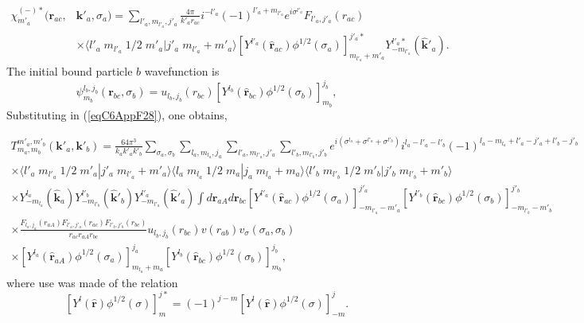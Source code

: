 \begin{subappendices}
\begin{equation}
\begin{split}
\chi^{(-)*}_{m'_a}(\mathbf{r}_{ac},&\mathbf{k}'_{a},\sigma_a)= \sum_{l'_a,m_{l'_a},j'_a}\frac{4\pi}{k'_a r_{ac}} i^{-l'_a}(-1)^{l'_a+m_{l'_a}}
e^{i\sigma^{l'_a}} F_{l'_a,j'_a}(r_{ac})\\
 &\times\langle l'_a\;m_{l'_a}\;1/2\;m'_a|j'_a\;m_{l'_a}+m'_a\rangle
 \left[ Y^{l'_a} (\hat {\mathbf{r}}_{ac})\phi^{1/2}(\sigma_a)\right]^{j'_a*}_{m_{l'_a}+m'_a}Y^{l'_a*}_{-m_{l'_a}} (\hat {\mathbf{k}}'_a).
\end{split} 
\end{equation}
The initial bound particle $b$ wavefunction	  is
 \begin{equation}\label{eqC6AppG36}
\psi_{m_b}^{l_b,j_b}(\mathbf{r}_{bc},\sigma_b)=u_{l_b,j_b}(r_{bc})\left[ Y^{l_b} (\hat {\mathbf{r}}_{bc})\phi^{1/2}(\sigma_b)\right]^{j_b}_{m_b},
\end{equation}
Substituting in (\ref{eqC6AppF28}), one obtains,

\begin{multline}\label{eqC6AppG37}
T_{m_a,m_b}^{m'_a,m'_b}(\mathbf{k}'_a,\mathbf{k}'_b)=\frac{64\pi^3}{k_ak'_ak'_b}\sum_{\sigma_a,\sigma_b}\sum_{l_a,m_{l_a},j_a}\sum_{l'_a,m_{l'_a},j'_a}\sum_{l'_b,m_{l'_b},j'_b}
 e^{i(\sigma^{l_a}+\sigma^{l'_a}+\sigma^{l'_b})}i^{l_a-l'_a-l'_b}(-1)^{l_a-m_{l_a}+l'_a-j'_a+l'_b-j'_b}\\
\times \langle l'_a\;m_{l'_a}\;1/2\;m'_a|j'_a\;m_{l'_a}+m'_a\rangle \langle l_a\;m_{l_a}\;1/2\;m_a|j_a\;m_{l_a}+m_a\rangle\langle l'_b\;m_{l'_b}\;1/2\;m'_b|j'_b\;m_{l'_b}+m'_b\rangle\\
\times Y^{l_a}_{-m_{l_a}} (\hat {\mathbf{k}}_a)Y^{l'_b}_{-m_{l'_b}} (\hat {\mathbf{k}}'_b)Y^{l'_a}_{-m_{l'_a}} (\hat {\mathbf{k}}'_a)
\int d\mathbf{r}_{aA}d \mathbf{r}_{bc}\left[ Y^{l'_a} (\hat {\mathbf{r}}_{ac})\phi^{1/2}(\sigma_a)\right]^{j'_a}_{-m_{l'_a}-m'_a}\left[ Y^{l'_b} (\hat {\mathbf{r}}_{bc})\phi^{1/2}(\sigma_b)\right]^{j'_b}_{-m_{l'_b}-m'_b}\\
\times \frac{F_{l_a,j_a}(r_{aA})  F_{l'_a,j'_a}(r_{ac})F_{l'_b,j'_b}(r_{bc})}{r_{ac}r_{aA}r_{bc}}u_{l_b,j_b}(r_{bc})v(r_{ab})v_\sigma(\sigma_a,\sigma_b)\\
\times\left[ Y^{l_a} (\hat {\mathbf{r}}_{aA})\phi^{1/2}(\sigma_a)\right]^{j_a}_{m_{l_a}+m_a}\left[ Y^{l_b} (\hat {\mathbf{r}}_{bc})\phi^{1/2}(\sigma_b)\right]^{j_b}_{m_b},
\end{multline}
where  use was made of the relation
 \begin{equation}\label{eqC6AppG38}
\left[ Y^{l} (\hat {\mathbf{r}})\phi^{1/2}(\sigma)\right]^{j*}_{m}=(-1)^{j-m}\left[Y^{l} (\hat {\mathbf{r}})\phi^{1/2}(\sigma)\right]^{j}_{-m}.
\end{equation}

\end{subappendices}
